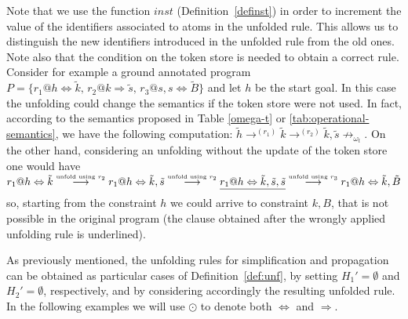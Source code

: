 \documentclass[final]{acmtrans2e}
\begin{document}
Note that we use  the function $inst$  (Definition~\ref{definst})
in order to increment the value of the
identifiers associated to atoms in the unfolded rule. This allows
us to distinguish the new identifiers introduced in the unfolded
rule from the old ones. Note also that the condition on the token
store is needed to obtain a correct rule.  Consider for example a ground annotated
program  $P=\{r_1@ h \Leftrightarrow \tilde k, \, r_2@k
\Rightarrow \tilde s, \, r_3@s,s\Leftrightarrow \tilde B\}$ and let
$h$ be  the start goal. In this case the unfolding could change
the semantics if the token store were not used. In fact, according
to the semantics proposed in Table \ref{omega-t} or
\ref{tab:operational-semantics}, we have the following
computation: $\tilde h\rightarrow^{(r_1)}\tilde
k\rightarrow^{(r_2)}\tilde k, \tilde
s\not\rightarrow_{\omega_t}$. On the other hand,  considering an
unfolding without the update of  the token store one would have
$r_1@ h\Leftrightarrow \tilde k \stackrel{\mbox{\tiny{unfold using
$r_2$}}}{\longrightarrow} r_1@ h\Leftrightarrow \tilde k, \tilde s
\stackrel{\mbox{\tiny{unfold using
$r_2$}}}{\longrightarrow}\sout{r_1@h\Leftrightarrow \tilde k,
\tilde s, \tilde s}\stackrel{\mbox{\tiny{unfold using
$r_3$}}}{\longrightarrow}r_1@h\Leftrightarrow \tilde k, \tilde B$
so, starting from the constraint $h$ we could arrive to constraint $k, B$, that
is not possible in the original program (the clause obtained after
the wrongly applied unfolding rule is underlined).


As previously mentioned, the unfolding rules for simplification
and propagation can be obtained as particular cases of
Definition~\ref{def:unf}, by setting $H_1'=\emptyset$ and  $H_2'
=\emptyset$, respectively, and by considering accordingly the
resulting unfolded rule. In the following examples we will use
$\odot$ to denote both  $\Leftrightarrow$ and $\Rightarrow$.
\end{document}
